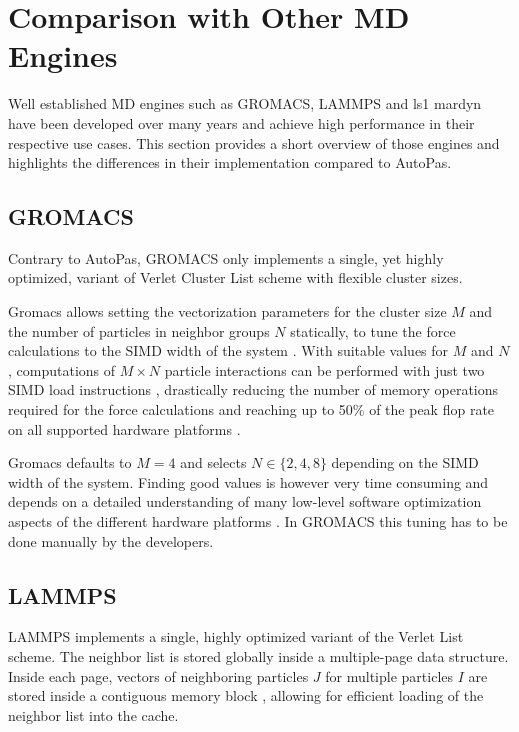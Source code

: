 \documentclass[conference]{IEEEtran}
\begin{document}
\section{Comparison with Other MD Engines}

Well established MD engines such as GROMACS, LAMMPS and ls1 mardyn have been developed over many years and achieve high performance in their respective use cases. This section provides a short overview of those engines and highlights the differences in their implementation compared to AutoPas.


\subsection{GROMACS}

Contrary to AutoPas, GROMACS only implements a single, yet highly optimized, variant of Verlet Cluster List scheme with flexible cluster sizes.

Gromacs allows setting the vectorization parameters for the cluster size $M$ and the number of particles in neighbor groups $N$ statically, to tune the force calculations to the SIMD width of the system \cite{PALL20132641}. With suitable values for $M$ and $N$, computations of $M \times N$ particle interactions can be performed with just two SIMD load instructions \cite{Solving_Software_Challenges_Exascale_2014}, drastically reducing the number of memory operations required for the force calculations and reaching up to 50\% of the peak flop rate on all supported hardware platforms \cite{Solving_Software_Challenges_Exascale_2014}.

Gromacs defaults to $M=4$ and selects $N \in \{2, 4, 8\}$ depending on the SIMD width of the system. Finding good values is however very time consuming and depends on a detailed understanding of many low-level software optimization aspects of the different hardware platforms \cite{PALL20132641}. In GROMACS this tuning has to be done manually by the developers.

\subsection{LAMMPS}

LAMMPS implements a single, highly optimized variant of the Verlet List scheme. The neighbor list is stored globally inside a multiple-page data structure. Inside each page, vectors of neighboring particles $J$ for multiple particles $I$ are stored inside a contiguous memory block \cite{THOMPSON2022108171}, allowing for efficient loading of the neighbor list into the cache.
\end{document}
